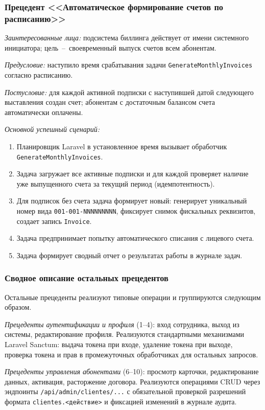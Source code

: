 \subsubsection{Прецедент <<Автоматическое формирование счетов по расписанию>>}

\emph{Заинтересованные лица:} подсистема биллинга действует от имени системного инициатора; цель~--~своевременный выпуск счетов всем абонентам.

\emph{Предусловие:} наступило время срабатывания задачи \texttt{GenerateMonthlyInvoices} согласно расписанию.

\emph{Постусловие:} для каждой активной подписки с наступившей датой следующего выставления создан счет; абонентам с достаточным балансом счета автоматически оплачены.

\emph{Основной успешный сценарий:}
\begin{enumerate}
\item Планировщик Laravel в установленное время вызывает обработчик \texttt{GenerateMonthlyInvoices}.
\item Задача загружает все активные подписки и для каждой проверяет наличие уже выпущенного счета за текущий период (идемпотентность).
\item Для подписок без счета задача формирует новый: генерирует уникальный номер вида \texttt{001-001-NNNNNNNNN}, фиксирует снимок фискальных реквизитов, создает запись \texttt{Invoice}.
\item Задача предпринимает попытку автоматического списания с лицевого счета.
\item Задача формирует сводный отчет о результатах работы в журнале задач.
\end{enumerate}

\subsubsection{Сводное описание остальных прецедентов}

Остальные прецеденты реализуют типовые операции и группируются следующим образом.

\emph{Прецеденты аутентификации и профиля} (1--4): вход сотрудника, выход из системы, редактирование профиля. Реализуются стандартными механизмами Laravel Sanctum: выдача токена при входе, удаление токена при выходе, проверка токена и прав в промежуточных обработчиках для остальных запросов.

\emph{Прецеденты управления абонентами} (6--10): просмотр карточки, редактирование данных, активация, расторжение договора. Реализуются операциями CRUD через эндпоинты \texttt{/api/admin/clientes/...} с обязательной проверкой разрешений формата \texttt{clientes.<действие>} и фиксацией изменений в журнале аудита.

